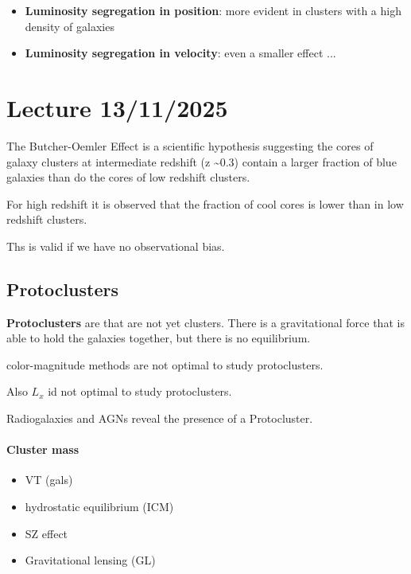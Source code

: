 \begin{itemize}
    \item \textbf{Luminosity segregation in position}: more evident in clusters with a high density of galaxies
    \item \textbf{Luminosity segregation in velocity}: even a smaller effect ...
\end{itemize}



\newpage

\chapter{Lecture 13/11/2025}


The Butcher-Oemler Effect is a scientific hypothesis suggesting the cores of galaxy clusters at intermediate redshift (z \textasciitilde 0.3) contain a larger fraction of blue galaxies than do the cores of low redshift clusters.

For high redshift it is observed that the fraction of cool cores is lower than in low redshift clusters.

Ths is valid if we have no observational bias.

\section{Protoclusters}

\textbf{Protoclusters} are  that are not yet clusters. There is a gravitational force that is able to hold the galaxies together, but there is no equilibrium.

color-magnitude methods are not optimal to study protoclusters.

Also $L_x$ id not optimal to study protoclusters.

Radiogalaxies and AGNs reveal the presence of a Protocluster.

\subsubsection{Cluster mass}

\begin{itemize}
    \item VT (gals)
    \item hydrostatic equilibrium (ICM)
    \item SZ effect
    \item Gravitational lensing (GL)
\end{itemize}

